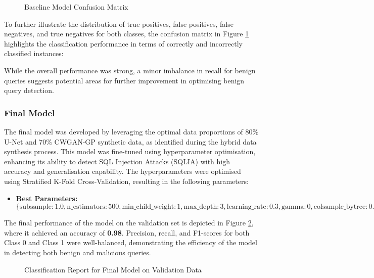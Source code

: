 \documentclass[journal]{IEEEtran}
\begin{document}
\setlength\fboxrule{0.5pt} 
\begin{figure}[H]
    \centering
    \caption{Baseline Model Confusion Matrix}
    \label{fig:cmbasemod}
\end{figure}

To further illustrate the distribution of true positives, false positives, false negatives, and true negatives for both classes, the confusion matrix in Figure \ref{fig:cmbasemod} highlights the classification performance in terms of correctly and incorrectly classified instances:


While the overall performance was strong, a minor imbalance in recall for benign queries suggests potential areas for further improvement in optimising benign query detection.

\subsubsection{Final Model}

The final model was developed by leveraging the optimal data proportions of 80\% U-Net and 70\% CWGAN-GP synthetic data, as identified during the hybrid data synthesis process. This model was fine-tuned using hyperparameter optimisation, enhancing its ability to detect SQL Injection Attacks (SQLIA) with high accuracy and generalisation capability. The hyperparameters were optimised using Stratified K-Fold Cross-Validation, resulting in the following parameters:

\begin{itemize}
    \item \textbf{Best Parameters:} $\{ \text{subsample}: 1.0, \text{n\_estimators}: 500, \text{min\_child\_weight}: 1, \text{max\_depth}: 3, \text{learning\_rate}: 0.3, \text{gamma}: 0, \text{colsample\_bytree}: 0.8 \}$
\end{itemize}

The final performance of the model on the validation set is depicted in Figure \ref{fig:finalmod}, where it achieved an accuracy of \textbf{0.98}. Precision, recall, and F1-scores for both Class 0 and Class 1 were well-balanced, demonstrating the efficiency of the model in detecting both benign and malicious queries.

\setlength\fboxrule{0.5pt}
\begin{figure}[H]
    \centering
    \caption{Classification Report for Final Model on Validation Data}
    \label{fig:finalmod}
\end{figure}
\end{document}
